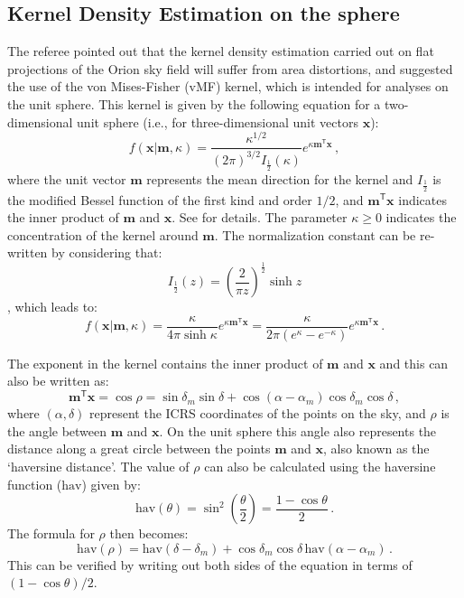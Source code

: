 \documentclass[twocolumn]{aa}
\begin{document}
\begin{appendix}
\section{Kernel Density Estimation on the sphere}
The referee pointed out that the kernel density estimation carried out on flat projections of the
Orion sky field will suffer from area distortions, and suggested the use of the von Mises-Fisher
(vMF) kernel, which is intended for analyses on the unit sphere. This kernel is given by the
following equation for a two-dimensional unit sphere (i.e., for three-dimensional unit vectors
$\mathbf{x}$):
\begin{equation}
  f(\mathbf{x}|\mathbf{m}, \kappa) = \frac{\kappa^{1/2}}{(2\pi)^{3/2} I_\frac{1}{2}(\kappa)}
  e^{\kappa\mathbf{m}^\mathsf{T}\mathbf{x}}\,,
  \label{eq:vMFkernel3D}
\end{equation}
where the unit vector $\mathbf{m}$ represents the mean direction for the kernel and
$I_\frac{1}{2}$ is the modified Bessel function of the first kind and order $1/2$, and
$\mathbf{m}^\mathsf{T}\mathbf{x}$ indicates the inner product of $\mathbf{m}$ and $\mathbf{x}$. See
\cite{vmFPaper} for details. The parameter $\kappa\geq0$ indicates the concentration of the
kernel around $\mathbf{m}$. The normalization constant can be re-written by considering that:
\begin{equation}
  I_{\frac{1}{2}}\left(z\right)=\left(\frac{2}{\pi z}\right)^{\frac{1}{2}}\sinh z
\end{equation}
\citep[eq.\ 10.39.1 in][]{NIST}, which leads to:
\begin{equation}
  f(\mathbf{x}|\mathbf{m}, \kappa) = \frac{\kappa}{4\pi\sinh\kappa}
  e^{\kappa\mathbf{m}^\mathsf{T}\mathbf{x}} = \frac{\kappa}{2\pi(e^\kappa-e^{-\kappa})}
  e^{\kappa\mathbf{m}^\mathsf{T}\mathbf{x}}\,.
\end{equation}

The exponent in the kernel contains the inner product of $\mathbf{m}$ and $\mathbf{x}$ and this can
also be written as:
\begin{equation}
  \mathbf{m}^\mathsf{T}\mathbf{x} = \cos\rho = \sin\delta_{m}\sin\delta + \cos(\alpha-\alpha_{m})
  \cos\delta_{m}\cos\delta\,,
\end{equation}
where $(\alpha, \delta)$ represent the ICRS coordinates of the points on the sky, and $\rho$ is the
angle between $\mathbf{m}$ and $\mathbf{x}$. On the unit sphere this angle also represents the
distance along a great circle between the points $\mathbf{m}$ and $\mathbf{x}$, also known as the
`haversine distance'. The value of $\rho$ can also be calculated using the haversine function
($\mathrm{hav}$) given by:
\begin{equation}
  \mathrm{hav}(\theta) = \sin^2\left(\frac{\theta}{2}\right) = \frac{1-\cos\theta}{2}\,.
\end{equation}
The formula for $\rho$ then becomes:
\begin{equation}
  \mathrm{hav}(\rho) = \mathrm{hav}(\delta-\delta_m) + \cos\delta_m\cos\delta \,\mathrm{hav}(\alpha-\alpha_m)\,.
\end{equation}
This can be verified by writing out both sides of the equation in terms of $(1-\cos\theta)/2$.


\end{appendix}
\end{document}
